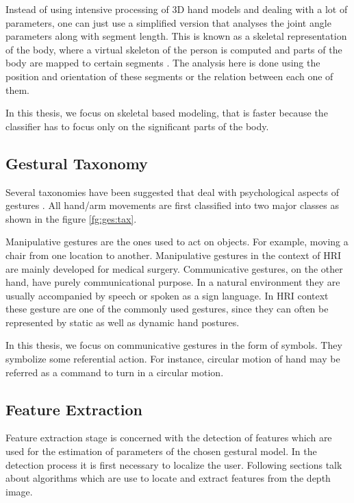 Instead of using intensive processing of 3D hand models and dealing with a lot of parameters, one can just use a simplified version that analyses the joint angle parameters along with segment length. This is known as a skeletal representation of the body, where a virtual skeleton of the person is computed and parts of the body are mapped to certain segments \cite{2}. The analysis here is done using the position and orientation of these segments or the relation between each one of them.

In this thesis, we focus on skeletal based modeling, that is faster because the classifier has to focus only on the significant parts of the body.

\subsection{Gestural Taxonomy} Several taxonomies have been suggested that deal with psychological aspects of gestures \cite{2}. All hand/arm movements are first classified into two major classes as shown in the figure \ref{fg:ges:tax}.



Manipulative gestures are the ones used to act on objects. For example, moving a chair from one location to another. Manipulative gestures in the context of HRI are mainly developed for medical surgery. Communicative gestures, on the other hand, have purely communicational purpose. In a natural environment they are usually accompanied by speech or spoken as a sign language. In HRI context these gesture are one of the commonly used gestures, since they can often be represented by static as well as dynamic hand postures.

In this thesis, we focus on communicative gestures in the form of symbols. They symbolize some referential action. For instance, circular motion of hand may be referred as a command to turn in a circular motion.

\subsection{Feature Extraction} Feature extraction stage is concerned with the detection of features which are used for the estimation of parameters of the chosen gestural model. In the detection process it is first necessary to localize the user. Following sections talk about algorithms which are use to locate and extract features from the depth image.

